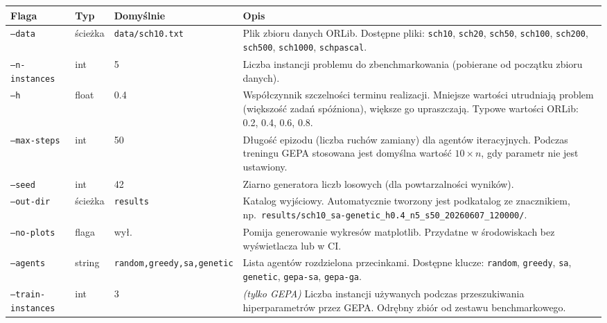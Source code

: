 \documentclass[11pt,a4paper]{article}
\begin{document}
\begin{longtable}{@{}p{4.5cm} p{2.2cm} p{2.2cm} p{6.3cm}@{}}
\toprule
\textbf{Flaga} & \textbf{Typ} & \textbf{Domyślnie} & \textbf{Opis} \\
\midrule
\endhead

\texttt{--data} & ścieżka & \texttt{data/sch10.txt} &
    Plik zbioru danych ORLib. Dostępne pliki: \texttt{sch10}, \texttt{sch20},
    \texttt{sch50}, \texttt{sch100}, \texttt{sch200}, \texttt{sch500},
    \texttt{sch1000}, \texttt{schpascal}. \\[4pt]

\texttt{--n-instances} & int & 5 &
    Liczba instancji problemu do zbenchmarkowania
    (pobierane od początku zbioru danych). \\[4pt]

\texttt{--h} & float & 0.4 &
    Współczynnik szczelności terminu realizacji. Mniejsze wartości
    utrudniają problem (większość zadań spóźniona), większe go upraszczają.
    Typowe wartości ORLib: 0.2, 0.4, 0.6, 0.8. \\[4pt]

\texttt{--max-steps} & int & 50 &
    Długość epizodu (liczba ruchów zamiany) dla agentów iteracyjnych.
    Podczas treningu GEPA stosowana jest domyślna wartość $10 \times n$,
    gdy parametr nie jest ustawiony. \\[4pt]

\texttt{--seed} & int & 42 &
    Ziarno generatora liczb losowych (dla powtarzalności wyników). \\[4pt]

\texttt{--out-dir} & ścieżka & \texttt{results} &
    Katalog wyjściowy. Automatycznie tworzony jest podkatalog ze znacznikiem,
    np.\ \texttt{results/sch10\_sa-genetic\_h0.4\_n5\_s50\_20260607\_120000/}. \\[4pt]

\texttt{--no-plots} & flaga & wył. &
    Pomija generowanie wykresów matplotlib.
    Przydatne w środowiskach bez wyświetlacza lub w CI. \\[4pt]

\texttt{--agents} & string & \texttt{random,greedy,sa,genetic} &
    Lista agentów rozdzielona przecinkami. Dostępne klucze: \texttt{random},
    \texttt{greedy}, \texttt{sa}, \texttt{genetic}, \texttt{gepa-sa},
    \texttt{gepa-ga}. \\[4pt]

\texttt{--train-instances} & int & 3 &
    \textit{(tylko GEPA)} Liczba instancji używanych podczas przeszukiwania
    hiperparametrów przez GEPA. Odrębny zbiór od zestawu benchmarkowego. \\[4pt]


\end{longtable}
\end{document}
